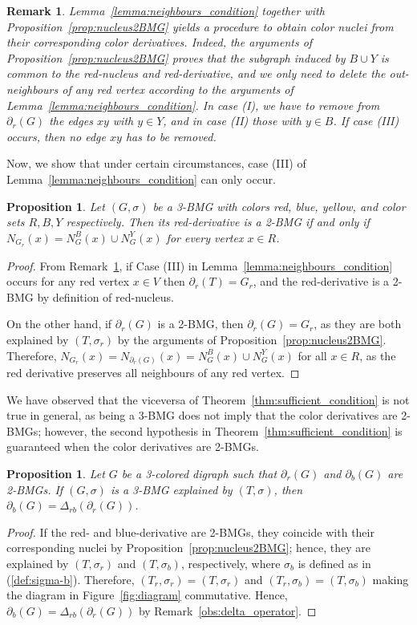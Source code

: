 \documentclass[final,3p,times]{elsarticle}
\newtheorem{proposition}[theorem]{Proposition}%
\newtheorem{remark}[theorem]{Remark}%
\begin{document}
\begin{remark}
\label{rm:derivative2nucleus}
Lemma~\ref{lemma:neighbours_condition} together with Proposition~\ref{prop:nucleus2BMG} yields a procedure to obtain color nuclei from their corresponding color derivatives. Indeed, the arguments of Proposition~\ref{prop:nucleus2BMG} proves that the subgraph induced by $B \cup Y$ is common to the red-nucleus and red-derivative, and we only need to delete the out-neighbours of any red vertex according to the arguments of Lemma~\ref{lemma:neighbours_condition}. In case (I), we have to remove from $\partial_r(G)$ the edges $xy$ with $y\in Y$, and in case (II) those with $y\in B$. If case (III) occurs, then no edge $xy$ has to be removed. 
\end{remark}
Now, we show that under certain circumstances, case (III) of Lemma~\ref{lemma:neighbours_condition} can only occur. 
\begin{proposition}
\label{prop:ch-2-BMGs-caseiii}
Let $(G,\sigma)$ be a 3-BMG with colors red, blue, yellow, and color sets $R,B,Y$ respectively. Then its red-derivative is a 2-BMG if and only if $N_{G_r}(x)=N_{G}^{B}(x)\cup N_{G}^{Y}(x)$ for every vertex $x\in R$.
\end{proposition}
\begin{proof}
From Remark~\ref{rm:derivative2nucleus}, if Case (III) in Lemma~\ref{lemma:neighbours_condition} occurs for any red vertex $x\in V$ then $\partial_r(T)=G_r$, and the red-derivative is a 2-BMG by definition of red-nucleus.

On the other hand, if $\partial_{r}(G)$ is a 2-BMG, then $\partial_{r}(G)=G_{r}$, as they are both explained by $(T,\sigma_r)$ by the arguments of Proposition~\ref{prop:nucleus2BMG}. Therefore, $N_{G_{r}}(x)= N_{\partial_{r}(G)}(x)=N_{G}^{B}(x)\cup N_{G}^{Y}(x)$ for all $x\in R$, as the red derivative preserves all neighbours of any red vertex.
\end{proof}
We have observed that the viceversa of Theorem~\ref{thm:sufficient_condition} is not true in general, as being a 3-BMG does not imply that the color derivatives are 2-BMGs; however, the second hypothesis in Theorem~\ref{thm:sufficient_condition} is guaranteed when the color derivatives are 2-BMGs. 
\begin{proposition}\label{prop:3BMGs_(D)}
Let $G$ be a 3-colored digraph such that $\partial_r(G)$ and $\partial_b(G)$ are 2-BMGs. If $(G,\sigma)$ is a 3-BMG explained by $(T,\sigma)$, then $\partial_b(G)=\Delta_{rb}(\partial_r(G))$.
\end{proposition}
\begin{proof}
If the red- and blue-derivative are 2-BMGs, they coincide with their corresponding nuclei by Proposition~\ref{prop:nucleus2BMG}; hence, they are explained by $(T,\sigma_r)$ and $(T,\sigma_b)$, respectively, where $\sigma_b$ is defined as in (\ref{def:sigma-b}). Therefore, $(T_r,\sigma_r)=(T,\sigma_r)$ and $(T_r,\sigma_b)=(T,\sigma_b)$ making the diagram in Figure~\ref{fig:diagram} commutative. Hence, $\partial_b(G)=\Delta_{rb}(\partial_r(G))$ by Remark~\ref{obs:delta_operator}.
\end{proof}
\end{document}
